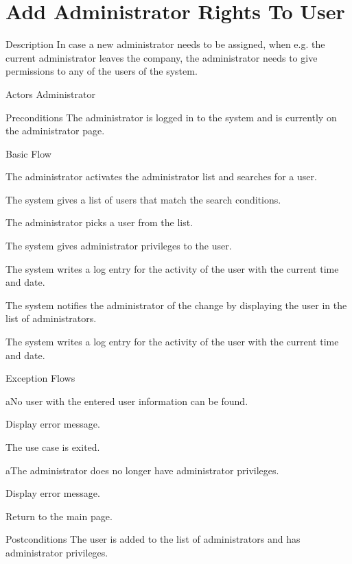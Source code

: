 \section{Add Administrator Rights To User}

%
\begin{cpart}{Description}
In case a new administrator needs to be assigned, when e.g. the current administrator  leaves the company, the administrator needs to give permissions to any of the users of the system.
\end{cpart}


%
\begin{cpart}{Actors}
Administrator
\end{cpart}

%
\begin{cpart}{Preconditions}
The administrator is logged in to the system and is currently on the administrator page.
\end{cpart}

%
\begin{cpartList}{Basic Flow}
  \item The administrator activates the administrator list and searches for a user.
  \item The system gives a list of users that match the search conditions.
  \item The administrator picks a user from the list.
  \item The system gives administrator privileges to the user.
  \item The system writes a log entry for the activity of the user with the current time and date.
  \item The system notifies the administrator of the change by displaying the user in the list of administrators.
  \item The system writes a log entry for the activity of the user with the current time and date.
\end{cpartList}

%
\begin{cpartList}{Exception Flows}
  \begin{innerList}{2}{a}{No user with the entered user information can be found.}
    \item Display error message.
    \item The use case is exited.
  \end{innerList}

  \begin{innerList}{4}{a}{The administrator does no longer have administrator privileges.}
    \item Display error message.
    \item Return to the main page.
  \end{innerList}
\end{cpartList}

%
\begin{cpart}{Postconditions}
The user is added to the list of administrators and has administrator privileges.
\end{cpart}

\clearpage
